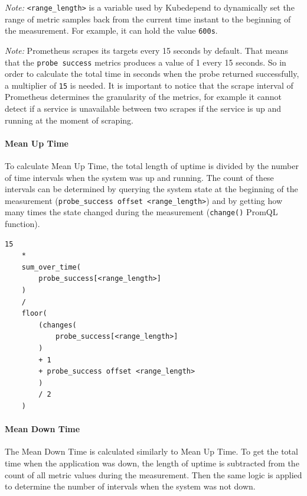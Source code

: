\emph{Note:} \texttt{<range\_length>} is a variable used by Kubedepend to dynamically set the range of metric samples back from the current time instant to the beginning of the measurement. For example, it can hold the value \texttt{600s}.

\emph{Note:} Prometheus scrapes its targets every 15 seconds by default. That means that the \texttt{probe\ success} metrics produces a value of 1 every 15 seconds. So in order to calculate the total time in seconds when the probe returned successfully, a multiplier of \texttt{15} is needed. It is important to notice that the scrape interval of Prometheus determines the granularity of the metrics, for example it cannot detect if a service is unavailable between two scrapes if the service is up and running at the moment of scraping.
 
 \paragraph{Mean Up Time} To calculate Mean Up Time, the total length of uptime is divided by the number of time intervals when the system was up and running. The count of these intervals can be determined by querying the system state at the beginning of the measurement (\texttt{probe\_success\ offset\ <range\_length>}) and by getting how many times the state changed during the measurement (\texttt{change()} PromQL function).
 
 \vspace{0.5cm}
 \begin{minipage}{\linewidth}
 	\begin{lstlisting}[caption={Mean Up Time defined in PromQL}, label={lst:promql-mut}]
 	15
 	* 
 	sum_over_time(
 		probe_success[<range_length>]
 	)
 	/ 
 	floor(
 		(changes(
 			probe_success[<range_length>]
 		)
 		+ 1
 		+ probe_success offset <range_length>
 		)
 		/ 2
 	)\end{lstlisting}
 \end{minipage}
 
 \paragraph{Mean Down Time} The Mean Down Time is calculated similarly to Mean Up Time. To get the total time when the application was down, the length of uptime is subtracted from the count of all metric values during the measurement. Then the same logic is applied to determine the number of intervals when the system was not down.
 
